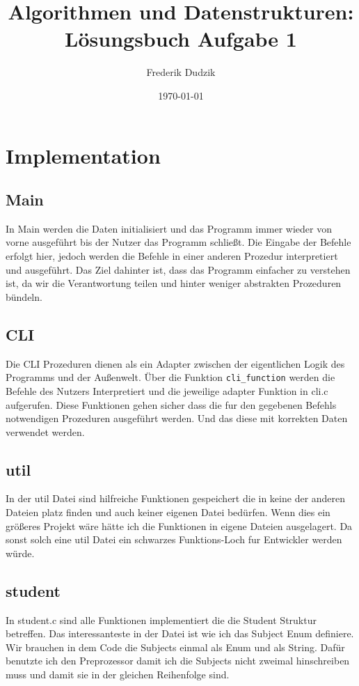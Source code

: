 \documentclass{article}
\title{Algorithmen und Datenstrukturen: Lösungsbuch Aufgabe 1}
\author{Frederik Dudzik}
\date{\today}
\begin{document}
\maketitle

\section{Implementation}
\subsection{Main}
In Main werden die Daten initialisiert und das Programm immer wieder von vorne ausgeführt bis der Nutzer das Programm schließt.
Die Eingabe der Befehle erfolgt hier, jedoch werden die Befehle in einer anderen Prozedur interpretiert und ausgeführt.
Das Ziel dahinter ist, dass das Programm einfacher zu verstehen ist, da wir die Verantwortung teilen und hinter weniger abstrakten Prozeduren bündeln.

\subsection{CLI}
Die CLI Prozeduren dienen als ein Adapter zwischen der eigentlichen Logik des Programms und der Außenwelt.
Über die Funktion \texttt{cli\_function} werden die Befehle des Nutzers Interpretiert und die jeweilige adapter Funktion in cli.c aufgerufen.
Diese Funktionen gehen sicher dass die fur den gegebenen Befehls notwendigen Prozeduren ausgeführt werden.
Und das diese mit korrekten Daten verwendet werden.

\subsection{util}
In der util Datei sind hilfreiche Funktionen gespeichert die in keine der anderen Dateien platz finden und auch keiner eigenen Datei bedürfen.
Wenn dies ein größeres Projekt wäre hätte ich die Funktionen in eigene Dateien ausgelagert.
Da sonst solch eine util Datei ein schwarzes Funktions-Loch fur Entwickler werden würde.

\subsection{student}
In student.c sind alle Funktionen implementiert die die Student Struktur betreffen.
Das interessanteste in der Datei ist wie ich das Subject Enum definiere.
Wir brauchen in dem Code die Subjects einmal als Enum und als String.
Dafür benutzte ich den Preprozessor damit ich die Subjects nicht zweimal hinschreiben muss und damit sie in der gleichen Reihenfolge sind.
\end{document}

